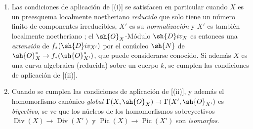 \begin{remark}[21.8.6]
\label{IV.21.8.6}
\begin{enumerate}[label=(\roman*)]
  \item Las condiciones de aplicación de [(i)] se satisfacen en particular cuando $X$ es un preesquema localmente noetheriano \emph{reducido} que solo tiene un número finito de componentes irreducibles, $X'$ es su \emph{normalización} y $X'$ es también localmente noetheriano ;
el $\sh{O}_X$-Módulo $\sh{D}iv_X$ es entonces una \emph{extensión} de $f_*(\sh{D}iv_{X'})$ por el conúcleo $\sh{N}$ de $\sh{O}^{*}_X\to f_*(\sh{O}^*_{X'})$, que puede considerarse conocido.
Si además $X$ es una curva algebraica (reducida) sobre un cuerpo $k$, se cumplen las condiciones de aplicación de [(ii)].

  \item Cuando se cumplen las condiciones de aplicación de [(ii)], y además el homomorfismo canónico \emph{global} $\Gamma(X,\sh{O}_X)\to\Gamma(X',\sh{O}_{X'})$ es \emph{biyectivo}, se ve que los núcleos de los homomorfismos sobreyectivos $\operatorname{Div}(X)\to\operatorname{Div}(X')$ y $\operatorname{Pic}(X)\to\operatorname{Pic}(X')$ son \emph{isomorfos}.


\end{enumerate}
\end{remark}
